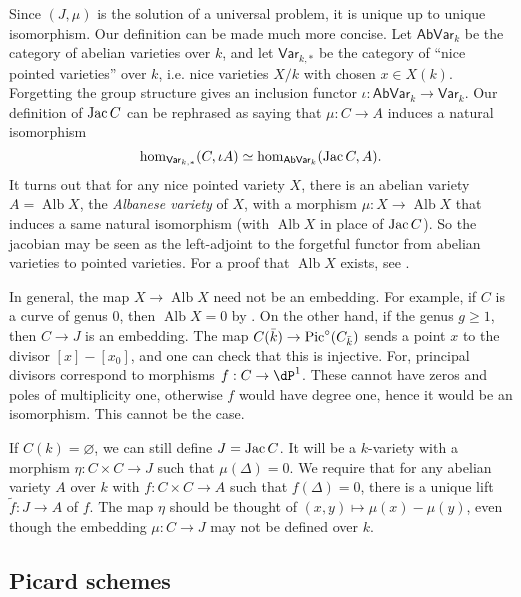 \documentclass{article}
\begin{document}
Since $(J,\mu)$ is the solution of a universal problem, it is unique up to 
unique isomorphism. Our definition can be made much more concise. Let 
$\mathsf{AbVar}_k$ be the category of abelian varieties over $k$, and let 
$\mathsf{Var}_{k,\ast}$ be the category of ``nice pointed varieties'' over $k$, 
i.e. nice varieties $X/k$ with chosen $x\in X(k)$. Forgetting the group 
structure gives an inclusion functor 
$\iota:\mathsf{AbVar}_k\to \mathsf{Var}_k$. Our definition of $\operatorname{Jac} C$ can be 
rephrased as saying that $\mu:C\to A$ induces a natural isomorphism 
\[
  \hom_{\mathsf{Var}_{k,\ast}}(C,\iota A) \simeq \hom_{\mathsf{AbVar}_k}(\operatorname{Jac} C,A)\text{.}
\]
It turns out that for any nice pointed variety $X$, there is an abelian variety 
$A=\operatorname{Alb} X$, the \emph{Albanese variety} of $X$, with a morphism 
$\mu:X\to \operatorname{Alb} X$ that induces a same natural isomorphism (with 
$\operatorname{Alb} X$ in place of $\operatorname{Jac} C$). So the jacobian may be seen as 
the left-adjoint to the forgetful functor from abelian varieties to pointed 
varieties. For a proof that $\operatorname{Alb} X$ exists, see 
\cite[A.11]{mo12}.

In general, the map $X\to \operatorname{Alb} X$ need not be an embedding. 
For example, if $C$ is a curve of genus $0$, then $\operatorname{Alb} X=0$ by 
\cite[I.3.9]{mi}. On the other hand, if the genus $g\geqslant 1$, then 
$C\to J$ is an embedding. The map $C(\bar k)\to \operatorname{Pic}^\circ(C_{\bar k})$ sends 
a point $x$ to the divisor $[x]-[x_0]$, and one can check that this is 
injective. For, principal divisors correspond to morphisms 
$f:C\to\dP^1$. These cannot have zeros and poles of multiplicity one, 
otherwise $f$ would have degree one, hence it would be an isomorphism. This 
cannot be the case. 

If $C(k)=\varnothing$, we can still define $J=\operatorname{Jac} C$. It will be a $k$-variety 
with a morphism $\eta:C\times C\to J$ such that $\mu(\Delta)=0$. We require 
that for any abelian variety $A$ over $k$ with $f:C\times C\to A$ such that 
$f(\Delta)=0$, there is a unique lift $\tilde f:J\to A$ of $f$. The map $\eta$ 
should be thought of $(x,y)\mapsto \mu(x)-\mu(y)$, even though the embedding 
$\mu:C\to J$ may not be defined over $k$. 





\subsection*{Picard schemes}
\end{document}
